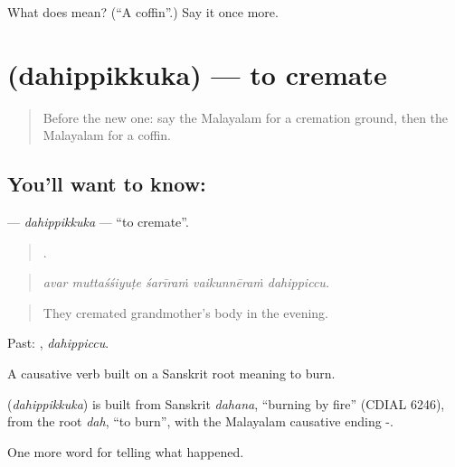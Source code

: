 \begin{tcolorbox}[breakable,colback=teal!4,colframe=teal!35!black,title={Before you move on}]
What does  mean? (\textquotedblleft{}A coffin\textquotedblright{}.) Say it once more.
\end{tcolorbox}
\section[\texorpdfstring{\ml{ദഹിപ്പിക്കുക} (dahippikkuka)}{ദഹിപ്പിക്കുക (dahippikkuka)}]{ (dahippikkuka) — to cremate}

\label{lesson:ML-C391-dahippikkuka}



\begin{quote}
Before the new one: say the Malayalam for a cremation ground, then the Malayalam for a coffin.
\end{quote}

\subsection*{You'll want to know: }
\textbf{} — \emph{dahippikkuka} — \textquotedblleft{}to cremate\textquotedblright{}.

\begin{quote}
    .
\end{quote}

\begin{quote}
\emph{avar muttaśśiyuṭe śarīraṁ vaikunnēraṁ dahippiccu.}
\end{quote}

\begin{quote}
They cremated grandmother's body in the evening.
\end{quote}

Past: , \emph{dahippiccu}.

A causative verb built on a Sanskrit root meaning to burn.

\begin{cousinweb}
\textbf{} (\emph{dahippikkuka}) is built from Sanskrit \emph{dahana}, \textquotedblleft{}burning by fire\textquotedblright{} (CDIAL 6246), from the root \emph{dah}, \textquotedblleft{}to burn\textquotedblright{}, with the Malayalam causative ending -.
\end{cousinweb}

\begin{grammarlens}[title={What you've built}]
One more word for telling what happened.
\end{grammarlens}

